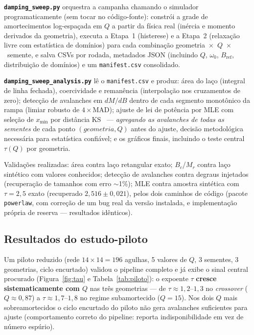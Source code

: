 \documentclass[11pt,a4paper]{article}
\newcommand{\code}[1]{\texttt{#1}}
\begin{document}
\textbf{\code{damping\_sweep.py}} orquestra a campanha chamando o
simulador programaticamente (sem tocar no código-fonte): constrói a
grade de amortecimentos log-espaçada em $Q$ a partir da física real
(inércia e momento derivados da geometria), executa a Etapa~1
(histerese) e a Etapa~2 (relaxação livre com estatística de domínios)
para cada combinação geometria~$\times$~$Q$~$\times$~semente, e salva
CSVs por rodada, metadados JSON (incluindo $Q$, $\omega_0$,
$B_{\mathrm{ref}}$, distribuição de domínios) e um \code{manifest.csv}
consolidado.

\textbf{\code{damping\_sweep\_analysis.py}} lê o \code{manifest.csv} e
produz: área do laço (integral de linha fechada), coercividade e
remanência (interpolação nos cruzamentos de zero); detecção de
avalanches em $dM/dB$ dentro de cada segmento monotônico da rampa
(limiar robusto de $4\times$MAD); ajuste de lei de potência por MLE com
seleção de $x_{\min}$ por distância KS~\cite{clauset2009} ---
\emph{agregando as avalanches de todas as sementes} de cada ponto
$(geometria, Q)$ antes do ajuste, decisão metodológica necessária para
estatística confiável; e os gráficos finais, incluindo o teste central
$\tau(Q)$ por geometria.

Validações realizadas: área contra laço retangular exato; $B_c$/$M_r$
contra laço sintético com valores conhecidos; detecção de avalanches
contra degraus injetados (recuperação de tamanhos com erro
$\sim$1\%); MLE contra amostra sintética com $\tau = 2{,}5$ exato
(recuperado $2{,}516 \pm 0{,}021$), pelos dois caminhos de código
(pacote \code{powerlaw}, com correção de um bug real da versão
instalada, e implementação própria de reserva --- resultados idênticos).

\subsection{Resultados do estudo-piloto}

Um piloto reduzido (rede $14\times14 = 196$ agulhas, 5 valores de $Q$,
3 sementes, 3 geometrias, ciclo encurtado) validou o pipeline completo
e já exibe o sinal central procurado
(Figura~\ref{fig:tau} e Tabela~\ref{tab:piloto}): o expoente $\tau$
\textbf{cresce sistematicamente com $Q$} nas três geometrias --- de
$\tau \approx 1{,}2$--$1{,}3$ no \emph{crossover} ($Q \approx 0{,}87$)
a $\tau \approx 1{,}7$--$1{,}8$ no regime subamortecido ($Q = 15$). Nos
dois $Q$ mais sobreamortecidos o ciclo encurtado do piloto não gera
avalanches suficientes para ajuste (comportamento correto do pipeline:
reporta indisponibilidade em vez de número espúrio).
\end{document}
